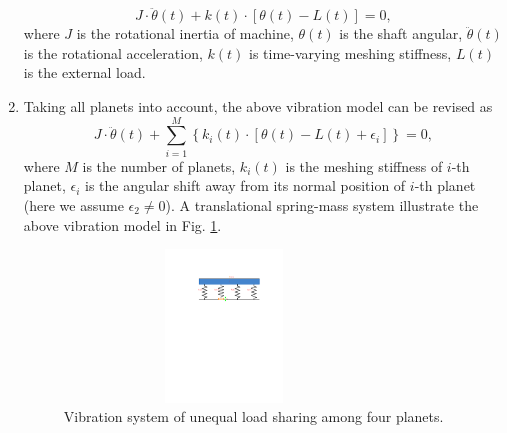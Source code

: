 \documentclass[a4paper,fleqn]{cas-sc}%
\begin{document}
\begin{enumerate}[1.]
\begin{equation}
        J \cdot \ddot{\theta}(t) + k(t) \cdot \left[\theta(t)-L(t) \right] = 0,
    \end{equation}
    where \(J\) is the rotational inertia of machine, \(\theta(t)\) is the shaft angular, \(\ddot{\theta}(t)\) is the rotational acceleration, \(k(t)\) is time-varying meshing stiffness, \(L(t)\) is the external load.
    \item Taking all planets into account, the above vibration model can be revised as
    \begin{equation}
        J \cdot \ddot{\theta}(t) + \sum^{M}_{i=1} \left\{ k_i(t) \cdot \left[\theta(t)-L(t)+\epsilon_i \right] \right\} = 0,
    \end{equation}
    where \(M\) is the number of planets, \(k_i(t)\) is the meshing stiffness of \(i\)-th planet, \(\epsilon_i\) is the angular shift away from its normal position of \(i\)-th planet (here we assume \(\epsilon_2\neq 0\)). A translational spring-mass system illustrate the above vibration model in Fig. \ref{fig:vibration_system_of_spring_mass}.
\begin{table}[!t] 
    \begin{framed} 
        \printnomenclature
    \end{framed}
\end{table}
    \begin{figure}
        \centering
        \includegraphics[scale=0.6,width=0.8\textwidth,height=1.6in]{spring_mass.pdf}
        \caption{Vibration system of unequal load sharing among four planets.}
    \label{fig:vibration_system_of_spring_mass}
    \end{figure}
\end{enumerate}
\end{document}

